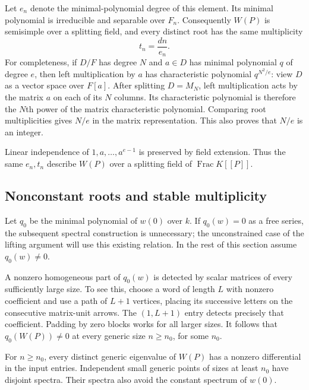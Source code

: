 Let $e_n$ denote the minimal-polynomial degree of this element.  Its
minimal polynomial is irreducible and separable over $F_n$.
Consequently $W(P)$ is semisimple over a splitting field, and every
distinct root has the same multiplicity
\begin{equation}
t_n=\frac{dn}{e_n}.
 \label{eq:generic-multiplicity}
\end{equation}
For completeness, if $D/F$ has degree $N$ and $a\in D$ has minimal
polynomial $q$ of degree $e$, then left multiplication by $a$ has
characteristic polynomial $q^{N^2/e}$: view $D$ as a vector space
over $F[a]$.  After splitting $D=M_N$, left multiplication acts by
the matrix $a$ on each of its $N$ columns.  Its characteristic
polynomial is therefore the $N$th power of the matrix characteristic
polynomial.  Comparing root multiplicities gives $N/e$ in the
matrix representation.  This also proves that $N/e$ is an integer.

Linear independence of $1,a,\ldots,a^{e-1}$ is preserved by field
extension.  Thus the same $e_n,t_n$ describe $W(P)$ over a splitting
field of $\operatorname{Frac}K[[P]]$.

\subsection{Nonconstant roots and stable multiplicity}
\label{subsec:stable-multiplicity}

Let $q_0$ be the minimal polynomial of $w(0)$ over $k$.  If
$q_0(w)=0$ as a free series, the subsequent spectral construction is
unnecessary; the unconstrained case of the lifting argument will use
this existing relation.  In the rest of this section assume
$q_0(w)\ne0$.

A nonzero homogeneous part of $q_0(w)$ is detected by scalar matrices
of every sufficiently large size.  To see this, choose a word of
length $L$ with nonzero coefficient and use a path of $L+1$ vertices,
placing its successive letters on the consecutive matrix-unit
arrows.  The $(1,L+1)$ entry detects precisely that coefficient.
Padding by zero blocks works for all larger sizes.  It follows that
$q_0(W(P))\ne0$ at every generic size $n\ge n_0$, for some $n_0$.

\begin{lemma}\label{lem:nonconstant-roots}
For $n\ge n_0$, every distinct generic eigenvalue of $W(P)$ has a
nonzero differential in the input entries.  Independent small generic
points of sizes at least $n_0$ have disjoint spectra.  Their spectra
also avoid the constant spectrum of $w(0)$.
\end{lemma}

